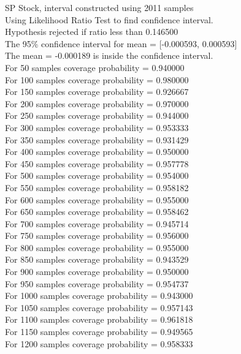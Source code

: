 \documentclass{article}
\begin{document}
SP Stock, interval constructed using 2011 samples\\
Using Likelihood Ratio Test to find confidence interval.\\
Hypothesis rejected if ratio less than 0.146500\\
The 95\% confidence interval for mean = [-0.000593, 0.000593]\\
The mean = -0.000189 is inside the confidence interval.\\
For 50 samples coverage probability = 0.940000\\
For 100 samples coverage probability = 0.980000\\
For 150 samples coverage probability = 0.926667\\
For 200 samples coverage probability = 0.970000\\
For 250 samples coverage probability = 0.944000\\
For 300 samples coverage probability = 0.953333\\
For 350 samples coverage probability = 0.931429\\
For 400 samples coverage probability = 0.950000\\
For 450 samples coverage probability = 0.957778\\
For 500 samples coverage probability = 0.954000\\
For 550 samples coverage probability = 0.958182\\
For 600 samples coverage probability = 0.955000\\
For 650 samples coverage probability = 0.958462\\
For 700 samples coverage probability = 0.945714\\
For 750 samples coverage probability = 0.956000\\
For 800 samples coverage probability = 0.955000\\
For 850 samples coverage probability = 0.943529\\
For 900 samples coverage probability = 0.950000\\
For 950 samples coverage probability = 0.954737\\
For 1000 samples coverage probability = 0.943000\\
For 1050 samples coverage probability = 0.957143\\
For 1100 samples coverage probability = 0.961818\\
For 1150 samples coverage probability = 0.949565\\
For 1200 samples coverage probability = 0.958333\\
\end{document}
